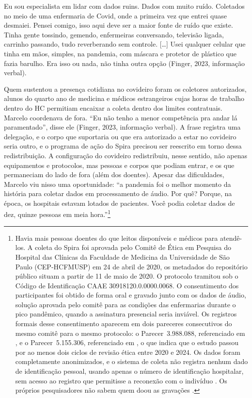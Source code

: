 \begin{citacaoabnt}
Eu sou especialista em lidar com dados ruins. Dados com muito ruído. Coletados no meio de uma enfermaria de Covid, onde a primeira vez que entrei quase desmaiei. Pensei comigo, isso aqui deve ser a maior fonte de ruído que existe. Tinha gente tossindo, gemendo, enfermeiras conversando, televisão ligada, carrinho passando, tudo reverberando sem controle. [\ldots] Usei qualquer celular que tinha em mãos, simples, na pandemia, com máscara e protetor de plástico que fazia barulho. Era isso ou nada, não tinha outra opção (Finger, 2023, informação verbal).
\end{citacaoabnt}

Quem sustentou a presença cotidiana no covideiro foram os coletores autorizados, alunos do quarto ano de medicina e médicos estrangeiros cujas horas de trabalho dentro do HC permitiam encaixar a coleta dentro dos limites contratuais. Marcelo coordenava de fora. \enquote{Eu não tenho a menor competência pra andar lá paramentado}, disse ele (Finger, 2023, informação verbal). A frase registra uma delegação, e o corpo que suportaria ou que era autorizado a estar no covideiro seria outro, e o programa de ação do Spira precisou ser reescrito em torno dessa redistribuição. A configuração do covideiro redistribuiu, nesse sentido, não apenas equipamentos e protocolos, mas pessoas e corpos que podiam entrar, e os que permaneciam do lado de fora (além dos doentes). Apesar das dificuldades, Marcelo viu nisso uma oportunidade: \enquote{a pandemia foi o melhor momento da história para coletar dados em processamento de áudio. Por quê? Porque, na época, os hospitais estavam lotados de pacientes. Você podia coletar dados de dez, quinze pessoas em meia hora.}\footnote{Havia mais pessoas doentes do que leitos disponíveis e médicos para atendê-los. A coleta do Spira foi aprovada pelo Comitê de Ética em Pesquisa do Hospital das Clínicas da Faculdade de Medicina da Universidade de São Paulo (CEP-HCFMUSP) em 24 de abril de 2020, os metadados do repositório público situam a partir de 11 de maio de 2020. O protocolo tramitou sob o Código de Identificação CAAE 30918120.0.0000.0068. O consentimento dos participantes foi obtido de forma oral e gravado junto com os dados de áudio, solução aprovada pelo comitê para as condições das enfermarias durante o pico pandêmico, quando a assinatura presencial seria inviável. Os registros formais desse consentimento aparecem em dois pareceres consecutivos do mesmo comitê para o mesmo protocolo: o Parecer~3.988.088, referenciado em \textcite{Berti2023Frequency}, e o Parecer~5.155.306, referenciado em \textcite{Berti2025Healthcare}, o que indica que o estudo passou por ao menos dois ciclos de revisão ética entre 2020 e 2024. Os dados foram completamente anonimizados, e o sistema de coleta não registra nenhum dado de identificação pessoal, usando apenas o número de identificação hospitalar, sem acesso ao registro que permitisse a reconexão com o indivíduo \parencite{Finger2025SPIRABM}. Os próprios pesquisadores não sabem quem doou as gravações \parencite{Casanova2021DeepLearning}.}

